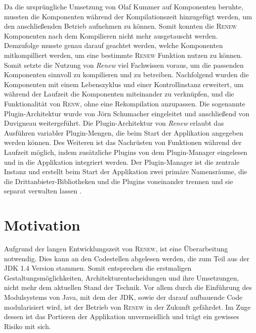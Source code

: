 	Da die ursprüngliche Umsetzung von Olaf Kummer auf Komponenten beruhte, mussten die Komponenten während der Kompilationszeit hinzugefügt werden, um den anschließenden Betrieb aufnehmen zu können. Somit konnten die \textsc{Renew} Komponenten nach dem Kompilieren nicht mehr ausgetauscht werden.\newline
	Demzufolge musste genau darauf geachtet werden, welche Komponenten mitkompilliert werden, um eine bestimmte \textsc{Renew} Funktion nutzen zu können. Somit setzte die Nutzung von \textit{Renew} viel Fachwissen voraus, um die passenden Komponenten sinnvoll zu kompilieren und zu betreiben. \newline 
	Nachfolgend wurden die Komponenten mit einem Lebenszyklus und einer Kontrollinstanz erweitert, um während der Laufzeit die Komponenten miteinander zu verknüpfen, und die Funktionalität von \textsc{Renw}, ohne eine Rekompilation anzupassen. Die sogenannte Plugin-Architektur wurde von Jörn Schumacher \cite{Schumacher03} eingeleitet und anschließend von Duvigneau \cite{Duvigneau09} weitergeführt.\newline
	Die Plugin-Architektur von \textit{Renew} erlaubt das Ausführen variabler Plugin-Mengen, die beim Start der Applikation angegeben werden können. Des Weiteren ist das Nachrüsten von Funktionen während der Laufzeit möglich, indem zusätzliche Plugins von dem Plugin-Manager eingelesen und in die Applikation integriert werden. Der Plugin-Manager ist die zentrale Instanz und erstellt beim Start der Applikation zwei primäre Namensräume, die die Drittanbieter-Bibliotheken und die Plugins voneinander trennen und sie separat verwalten lassen \cite{Duvigneau09}.

\section{Motivation} \label{sec:motivation1}
	Aufgrund der langen Entwicklungszeit von \textsc{Renew}, ist eine Überarbeitung notwendig. Dies kann an den Codestellen abgelesen werden, die zum Teil aus der JDK 1.4 Version stammen. Somit entsprechen die erstmaligen Gestaltungsmöglichkeiten, Architekturentscheidungen und ihre Umsetzungen, nicht mehr dem aktuellen Stand der Technik. Vor allem durch die Einführung des Modulsystems von Java, mit dem der JDK, sowie der darauf aufbauende Code modularisiert wird, ist der Betrieb von \textsc{Renew} in der Zukunft gefährdet. Im Zuge dessen ist das Portieren der Applikation unvermeidlich und trägt ein gewisses Risiko mit sich.

